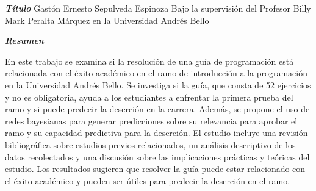 \begin{center}
    \textbf{\LARGE \textit{Título}}
    \vfill
    Gastón Ernesto Sepulveda Espinoza
    \vfill
    Bajo la supervisión del Profesor Billy Mark Peralta Márquez en la Universidad Andrés Bello
    \vfill
\end{center}
\vfill
\begin{center}
    \textbf{\LARGE \textit{Resumen}}
\end{center}
\vfill
En este trabajo se examina si la resolución de una guía de programación 
está relacionada con el éxito académico en el ramo de introducción a la 
programación en la Universidad Andrés Bello. Se investiga si la guía, que 
consta de 52 ejercicios y no es obligatoria, ayuda a los estudiantes 
a enfrentar la primera prueba del ramo y si puede predecir la deserción 
en la carrera. 
Además, se propone el uso de redes bayesianas para generar predicciones 
sobre su relevancia para aprobar el ramo y su capacidad predictiva para 
la deserción. El estudio incluye una revisión bibliográfica sobre estudios 
previos relacionados, un análisis descriptivo de los datos recolectados y 
una discusión sobre las implicaciones prácticas y teóricas del estudio. 
Los resultados sugieren que resolver la guía puede estar relacionado con 
el éxito académico y pueden ser útiles para predecir la deserción en el ramo.
\vfill